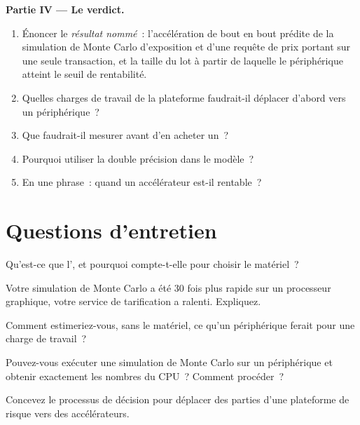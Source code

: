 \begin{problem}
\medskip\noindent\textbf{Partie IV --- Le verdict.}
\begin{enumerate}[resume]
\item Énoncer le \emph{résultat nommé}~: l'accélération de bout en bout prédite de la simulation de Monte Carlo d'exposition et d'une requête de prix portant sur une seule transaction, et
la taille du lot à partir de laquelle le périphérique atteint le seuil de rentabilité.
\item Quelles charges de travail de la plateforme faudrait-il déplacer d'abord vers un périphérique~?
\item Que faudrait-il mesurer avant d'en acheter un~?
\item Pourquoi utiliser la double précision dans le modèle~?
\item En une phrase~: quand un accélérateur est-il rentable~?
\end{enumerate}
\end{problem}

\section{Questions d'entretien}

\begin{interviewq}\label{iq:pl:accelerators-for-quantitative-work:1}
Qu'est-ce que l', et pourquoi compte-t-elle pour choisir le matériel~?
\end{interviewq}

\begin{interviewq}\label{iq:pl:accelerators-for-quantitative-work:2}
Votre simulation de Monte Carlo a été 30 fois plus rapide sur un processeur graphique, votre service de tarification a ralenti. Expliquez.
\end{interviewq}

\begin{interviewq}\label{iq:pl:accelerators-for-quantitative-work:3}
Comment estimeriez-vous, sans le matériel, ce qu'un périphérique ferait pour une charge de travail~?
\end{interviewq}

\begin{interviewq}\label{iq:pl:accelerators-for-quantitative-work:4}
Pouvez-vous exécuter une simulation de Monte Carlo sur un périphérique et obtenir exactement les nombres du CPU~? Comment procéder~?
\end{interviewq}

\begin{interviewq}\label{iq:pl:accelerators-for-quantitative-work:5}
Concevez le processus de décision pour déplacer des parties d'une plateforme de risque vers des accélérateurs.
\end{interviewq}

